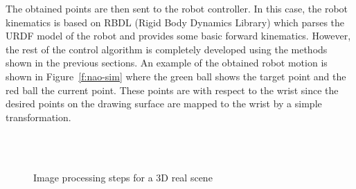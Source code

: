 \documentclass[conference]{IEEEtran}
\begin{document}
The obtained points are then sent to the robot controller. In this case, the robot kinematics is based on RBDL (Rigid Body Dynamics Library) which parses the URDF model of the robot and provides some basic forward kinematics. However, the rest of the control algorithm is completely developed using the methods shown in the previous sections. An example of the obtained robot motion is shown in Figure~\ref{f:nao-sim} where the green ball shows the target point and the red ball the current point. These points are with respect to the wrist since the desired points on the drawing surface are mapped to the wrist by a simple transformation.
\begin{figure}[htb]
\centering
{}
~\\
~
\caption{Image processing steps for a 3D real scene} \label{f:cup}
\end{figure}
\end{document}
